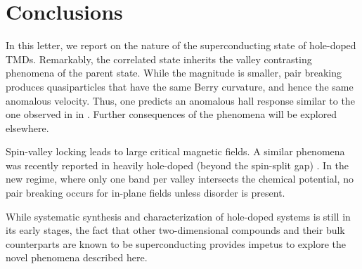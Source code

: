\section{Conclusions}

In this letter, we report on the nature of the superconducting state
of hole-doped TMDs.
Remarkably, the correlated state inherits
the valley contrasting phenomena of the parent state.
While the magnitude is smaller, pair breaking produces quasiparticles
that have the same Berry curvature, and hence the same anomalous velocity.
Thus, one predicts an anomalous hall response similar to
the one observed in in .
Further consequences of the phenomena will be explored elsewhere.

Spin-valley locking leads to large critical magnetic fields.
A similar phenomena was recently reported in heavily hole-doped
(beyond the spin-split gap) .
In the new regime, where only one band per valley intersects
the chemical potential, no pair breaking occurs
for in-plane fields unless disorder is present.

While systematic synthesis and characterization of hole-doped systems
is still in its early stages, the fact that other two-dimensional compounds
and their bulk counterparts are known to be superconducting
provides impetus to explore the novel phenomena described here.
